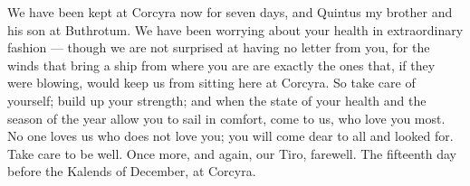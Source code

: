 

 We have been kept at Corcyra now for seven days, and Quintus my brother and his son at Buthrotum. We have been worrying about your health in extraordinary fashion --- though we are not surprised at having no letter from you, for the winds that bring a ship from where you are are exactly the ones that, if they were blowing, would keep us from sitting here at Corcyra. So take care of yourself; build up your strength; and when the state of your health and the season of the year allow you to sail in comfort, come to us, who love you most. No one loves us who does not love you; you will come dear to all and looked for. Take care to be well. Once more, and again, our Tiro, farewell. The fifteenth day before the Kalends of December, at Corcyra.
